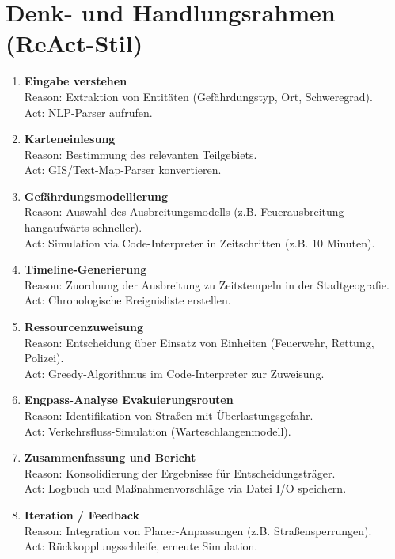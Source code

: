 \documentclass[a4paper,12pt]{scrartcl}
\begin{document}
\section{Denk- und Handlungsrahmen (ReAct-Stil)}
\begin{enumerate}
  \item \textbf{Eingabe verstehen}\\
    Reason: Extraktion von Entitäten (Gefährdungstyp, Ort, Schweregrad).\\
    Act: NLP-Parser aufrufen.
  \item \textbf{Karteneinlesung}\\
    Reason: Bestimmung des relevanten Teilgebiets.\\
    Act: GIS/Text-Map-Parser konvertieren.
  \item \textbf{Gefährdungsmodellierung}\\
    Reason: Auswahl des Ausbreitungsmodells (z.B. Feuerausbreitung hangaufwärts schneller).\\
    Act: Simulation via Code-Interpreter in Zeitschritten (z.B. 10 Minuten).
  \item \textbf{Timeline-Generierung}\\
    Reason: Zuordnung der Ausbreitung zu Zeitstempeln in der Stadtgeografie.\\
    Act: Chronologische Ereignisliste erstellen.
  \item \textbf{Ressourcenzuweisung}\\
    Reason: Entscheidung über Einsatz von Einheiten (Feuerwehr, Rettung, Polizei).\\
    Act: Greedy-Algorithmus im Code-Interpreter zur Zuweisung.
  \item \textbf{Engpass-Analyse Evakuierungsrouten}\\
    Reason: Identifikation von Straßen mit Überlastungsgefahr.\\
    Act: Verkehrsfluss-Simulation (Warteschlangenmodell).
  \item \textbf{Zusammenfassung und Bericht}\\
    Reason: Konsolidierung der Ergebnisse für Entscheidungsträger.\\
    Act: Logbuch und Maßnahmenvorschläge via Datei I/O speichern.
  \item \textbf{Iteration / Feedback}\\
    Reason: Integration von Planer-Anpassungen (z.B. Straßensperrungen).\\
    Act: Rückkopplungsschleife, erneute Simulation.
\end{enumerate}
\end{document}
